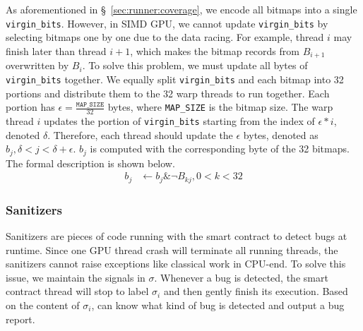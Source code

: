 As aforementioned in \S~\ref{sec:runner:coverage}, we encode all bitmaps into a single \texttt{virgin\_bits}. 
However, in SIMD GPU, we cannot update \texttt{virgin\_bits} by selecting bitmaps one by one due to the data racing. 
For example, thread $i$ may finish later than thread $i+1$, which makes the bitmap records from $B_{i+1}$ overwritten by $B_i$.
%
To solve this problem, we must update all bytes of \texttt{virgin\_bits} together.
We equally split \texttt{virgin\_bits} and each bitmap into 32 portions and distribute them to the 32 warp threads to run together. 
Each portion has $\epsilon = \frac{\texttt{MAP\_SIZE}}{32}$ bytes, where \texttt{MAP\_SIZE} is the bitmap size. 
The warp thread $i$ updates the portion of \texttt{virgin\_bits} starting from the index of $\epsilon * i$, denoted $\delta$. 
Therefore, each thread should update the $\epsilon$ bytes, denoted as $b_{j}, \delta < j < \delta + \epsilon$.
$b_j$ is computed with the corresponding byte of the 32 bitmaps. 
The formal description is shown below.
$$
\begin{aligned}
b_j &\gets b_j \& \neg B_{kj}, 0 < k < 32
\end{aligned}
$$


\subsubsection{Sanitizers}
Sanitizers are pieces of code running with the smart contract to detect bugs at runtime. 
Since one GPU thread crash will terminate all running threads, the sanitizers cannot raise exceptions like classical work in CPU-end. 
%
To solve this issue, we maintain the signals in $\sigma$.
Whenever a bug is detected, the smart contract thread will stop to label $\sigma_i$ and then gently  finish its execution. 
Based on the content of $\sigma_i$, {\runner} can know what kind of bug is detected and output a bug report. 